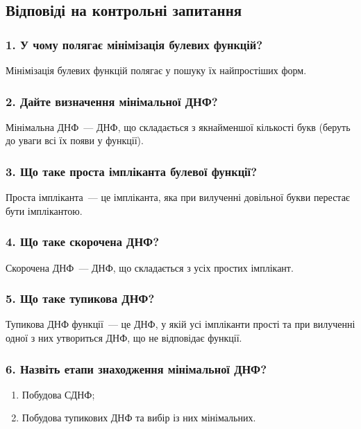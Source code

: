\documentclass[14pt]{extreport}
\begin{document}
\subsection*{Відповіді на контрольні запитання}

\subsubsection{1. У чому полягає мінімізація булевих функцій?}

Мінімізація булевих функцій полягає у пошуку
їх найпростіших форм.

\subsubsection*{2. Дайте визначення мінімальної ДНФ?}

Мінімальна ДНФ~--- ДНФ, що складається з
якнайменшої кількості букв (беруть до уваги
всі їх появи у функції).

\subsubsection*{3. Що таке проста імпліканта булевої функції?}

Проста імпліканта~--- це імпліканта, яка
при вилученні довільної букви перестає бути
імплікантою.

\subsubsection*{4. Що таке скорочена ДНФ?}

Скорочена ДНФ~--- ДНФ, що складається
з усіх простих імплікант.

\subsubsection*{5. Що таке тупикова ДНФ?}

Тупикова ДНФ функції~--- це ДНФ, у якій усі
імпліканти прості та при вилученні одної з
них утвориться ДНФ, що не відповідає функції.

\subsubsection*{6. Назвіть етапи знаходження мінімальної ДНФ?}

\begin{enumerate}
	\item Побудова СДНФ;
	\item Побудова тупикових ДНФ та вибір із них мінімальних.
\end{enumerate}
\end{document}
